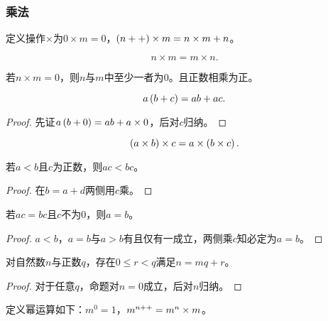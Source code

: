 \documentclass{ctexrep}
\begin{document}
  \subsubsection{乘法}
  \begin{definition}
    定义操作$\times$为$0\times m = 0$，$\left(n++\right)\times m = n \times m + n$。
  \end{definition}
  \begin{lemma}
    \[ n \times m = m \times n. \]
  \end{lemma}
  \begin{lemma}
    \label{lem:mn0}
    若$n \times m = 0$，则$n$与$m$中至少一者为$0$。且正数相乘为正。
  \end{lemma}
  \begin{proposition}
    \[ a\left(b+c\right) = ab+ac. \]
  \end{proposition}
  \begin{proof}
    先证$a\left(b+0\right) = ab + a\times 0$，后对$c$归纳。
  \end{proof}
  \begin{proposition}
    \[ \left(a\times b\right) \times c= a \times \left(b \times c\right). \]
  \end{proposition}
  \begin{proposition}
    若$a<b$且$c$为正数，则$ac<bc$。
  \end{proposition}
  \begin{proof}
    在$b=a+d$两侧用$c$乘。
  \end{proof}
  \begin{proposition}
    若$ac=bc$且$c$不为$0$，则$a=b$。
  \end{proposition}
  \begin{proof}
    $a<b$，$a=b$与$a>b$有且仅有一成立，两侧乘$c$知必定为$a=b$。
  \end{proof}
  \begin{proposition}
    对自然数$n$与正数$q$，存在$0\le r <q$满足$n=mq+r$。
  \end{proposition}
  \begin{proof}
    对于任意$q$，命题对$n=0$成立，后对$n$归纳。
  \end{proof}
  \begin{definition}
    定义幂运算如下：$m^0=1$，$m^{n++}=m^n\times m$。
  \end{definition}
\end{document}
